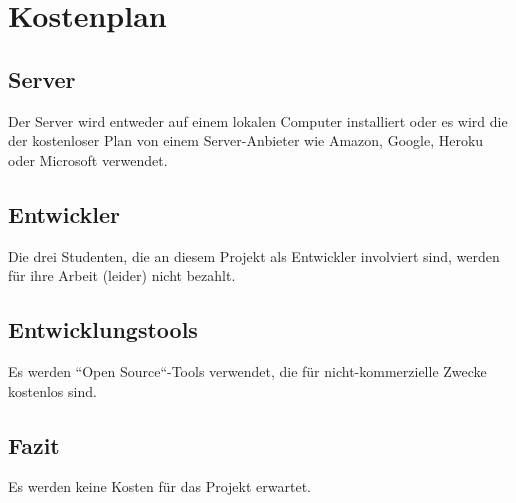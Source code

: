 \section{Kostenplan}
\subsection{Server}
Der Server wird entweder auf einem lokalen Computer installiert oder es wird die der kostenloser Plan von einem Server-Anbieter wie Amazon, Google, Heroku oder Microsoft verwendet.

\subsection{Entwickler}
Die drei Studenten, die an diesem Projekt als Entwickler involviert sind, werden für ihre Arbeit (leider) nicht bezahlt.

\subsection{Entwicklungstools}
Es werden ``Open Source``-Tools verwendet, die für nicht-kommerzielle Zwecke kostenlos sind.

\subsection{Fazit}
Es werden keine Kosten für das Projekt erwartet.